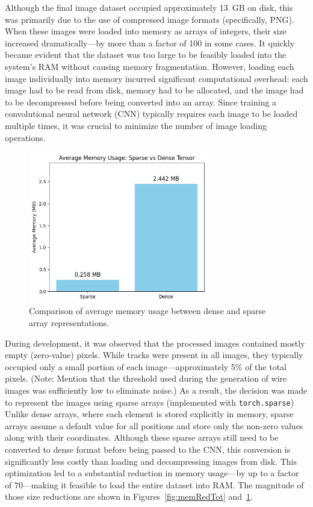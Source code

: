 \documentclass{pracalicmgr}
\begin{document}
Although the final image dataset occupied approximately 13~GB on disk, this was primarily due to the use of compressed image formats (specifically, PNG). When these images were loaded into memory as arrays of integers, their size increased dramatically—by more than a factor of 100 in some cases. It quickly became evident that the dataset was too large to be feasibly loaded into the system's RAM without causing memory fragmentation. However, loading each image individually into memory incurred significant computational overhead: each image had to be read from disk, memory had to be allocated, and the image had to be decompressed before being converted into an array. Since training a convolutional neural network (CNN) typically requires each image to be loaded multiple times, it was crucial to minimize the number of image loading operations.

\begin{figure}[H]
    \centering
    \includegraphics[width=0.7\textwidth]{src/sparseDenseComp.png}
    \caption{Comparison of average memory usage between dense and sparse array representations.}
    \label{fig:memRedAvg}
\end{figure}

During development, it was observed that the processed images contained mostly empty (zero-value) pixels. While tracks were present in all images, they typically occupied only a small portion of each image—approximately 5\% of the total pixels. (Note: Mention that the threshold used during the generation of wire images was sufficiently low to eliminate noise.) As a result, the decision was made to represent the images using sparse arrays (implemented with \texttt{torch.sparse}) Unlike dense arrays, where each element is stored explicitly in memory, sparse arrays assume a default value for all positions and store only the non-zero values along with their coordinates. Although these sparse arrays still need to be converted to dense format before being passed to the CNN, this conversion is significantly less costly than loading and decompressing images from disk. This optimization led to a substantial reduction in memory usage—by up to a factor of 70—making it feasible to load the entire dataset into RAM. The magnitude of those size reductions are shown in Figures~\ref{fig:memRedTot} and~\ref{fig:memRedAvg}.
\end{document}
